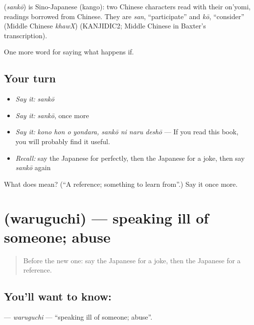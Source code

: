 \begin{cousinweb}
\textbf{} (\emph{sankō}) is Sino-Japanese (kango): two Chinese characters read with their on'yomi, readings borrowed from Chinese. They are \emph{san}, \textquotedblleft{}participate\textquotedblright{} and \emph{kō}, \textquotedblleft{}consider\textquotedblright{} (Middle Chinese \emph{khawX}) (KANJIDIC2; Middle Chinese in Baxter's transcription).
\end{cousinweb}

\begin{grammarlens}[title={What you've built}]
One more word for saying what happens if.
\end{grammarlens}

\subsection*{Your turn}
\begin{itemize}
\raggedright
  \item \emph{Say it:} \emph{sankō}
  \item \emph{Say it:} \emph{sankō}, once more
  \item \emph{Say it:} \emph{kono hon o yondara, sankō ni naru deshō} — If you read this book, you will probably find it useful.
  \item \emph{Recall:} say the Japanese for perfectly, then the Japanese for a joke, then say \emph{sankō} again
\end{itemize}

\begin{tcolorbox}[breakable,colback=teal!4,colframe=teal!35!black,title={Before you move on}]
What does  mean? (\textquotedblleft{}A reference; something to learn from\textquotedblright{}.) Say it once more.
\end{tcolorbox}
\section[\texorpdfstring{\ja{わるぐち} (waruguchi)}{わるぐち (waruguchi)}]{ (waruguchi) — speaking ill of someone; abuse}

\label{lesson:JA-C371-waruguchi}



\begin{quote}
Before the new one: say the Japanese for a joke, then the Japanese for a reference.
\end{quote}

\subsection*{You'll want to know: }
\textbf{} — \emph{waruguchi} — \textquotedblleft{}speaking ill of someone; abuse\textquotedblright{}.


